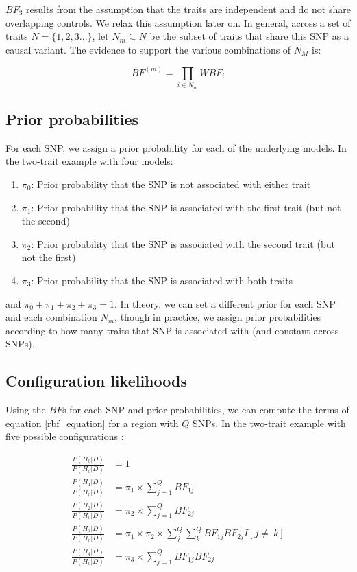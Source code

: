 \documentclass{article}
\begin{document}
\noindent $BF_3$ results from the assumption that the traits are independent and do not share overlapping controls. We relax this assumption later on. In general, across a set of traits $N = \big\{1,2,3...\big\}$, let $N_m \subseteq N$ be the subset of traits that share this SNP as a causal variant. The evidence to support the various combinations of $N_M$ is:

\begin{equation}
BF^{(m)} = \prod_{i \in N_m} WBF_i
\end{equation}


\subsection{Prior probabilities}
For each SNP, we assign a prior probability for each of the underlying models. In the two-trait example with four models:
\begin{enumerate}[start=0]
  \item $\pi_0$: Prior probability that the SNP is not associated with either trait
  \item $\pi_1$: Prior probability that the SNP is associated with the first trait (but not the second)
  \item $\pi_2$: Prior probability that the SNP is associated with the second trait (but not the first)
  \item $\pi_3$: Prior probability that the SNP is associated with both traits
\end{enumerate}

\noindent and $\pi_0 + \pi_1 + \pi_2 + \pi_3 = 1$. In theory, we can set a different prior for each SNP and each combination $N_m$, though in practice, we assign prior probabilities according to how many traits that SNP is associated with (and constant across SNPs). 

\subsection{Configuration likelihoods}
Using the $BF$s for each SNP and prior probabilities, we can compute the terms of equation \ref{rbf_equation} for a region with $Q$ SNPs. In the two-trait example with five possible configurations \citep{Giambartolomei:2014aa}:

\begin{align}
\frac{P(H_0|D)}{P(H_0|D)} & = 1 \\
\frac{P(H_1|D)}{P(H_0|D)} & = \pi_1 \times \sum_{j=1}^Q BF_{1j} \\
\frac{P(H_2|D)}{P(H_0|D)} & = \pi_2 \times \sum_{j=1}^Q BF_{2j} \\
\label{h3}
\frac{P(H_3|D)}{P(H_0|D)} & = \pi_1 \times \pi_2 \times \sum_{j}^Q \sum_{k}^Q BF_{1j} BF_{2j} I[j \ne\ k] \\
\frac{P(H_4|D)}{P(H_0|D)} & = \pi_{3} \times \sum_{j=1}^Q BF_{1j} BF_{2j}
\end{align}
\end{document}

